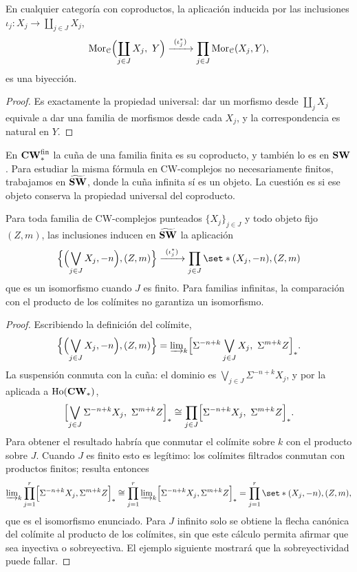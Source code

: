 \begin{lema}\label{lema:prod-morfismos}
En cualquier categoría con coproductos, la aplicación inducida por las inclusiones $\iota_j\colon X_j\to\coprod_{j\in J}X_j$,
\[
\hom_{\mathcal C}\Bigl(\coprod_{j\in J}X_j,\ Y\Bigr)\xrightarrow{\ (\iota_j^*)\ }\prod_{j\in J}\hom_{\mathcal C}(X_j,Y),
\]
es una biyección.
\end{lema}
\begin{proof}
Es exactamente la propiedad universal: dar un morfismo desde $\coprod_jX_j$ equivale a dar una familia de morfismos desde cada $X_j$, y la correspondencia es natural en $Y$.
\end{proof}

En $\CWstar^{\mathrm{fin}}$ la cuña de una familia finita es su coproducto, y también lo es en $\SW$. Para estudiar la misma fórmula en CW-complejos no necesariamente finitos, trabajamos en $\ESW$, donde la cuña infinita sí es un objeto. La cuestión es si ese objeto conserva la propiedad universal del coproducto.

\begin{prop}\label{prop:aditividad-familias}
Para toda familia de CW-complejos punteados $\{X_j\}_{j\in J}$ y todo objeto fijo $(Z,m)$, las inclusiones inducen en $\ESW$ la aplicación
\[
\Bigl\{\Bigl(\bigvee_{j\in J}X_j,-n\Bigr),(Z,m)\Bigr\}\xrightarrow{\ (\iota_j^*)\ }\prod_{j\in J}\set*{(X_j,-n),(Z,m)}
\]
que es un isomorfismo cuando $J$ es finito. Para familias infinitas, la comparación con el producto de los colímites no garantiza un isomorfismo.
\end{prop}
\begin{proof}
Escribiendo la definición del colímite,
\[
\Bigl\{\Bigl(\bigvee_{j\in J}X_j,-n\Bigr),(Z,m)\Bigr\}
=\varinjlim\nolimits_k\Bigl[\Sigma^{-n+k}\bigvee_{j\in J}X_j,\ \Sigma^{m+k}Z\Bigr]_* .
\]
La suspensión conmuta con la cuña: el dominio es $\bigvee_{j\in J}\Sigma^{-n+k}X_j$, y por la  aplicada a $\Ho(\CWstar)$,
\[
\Bigl[\bigvee_{j\in J}\Sigma^{-n+k}X_j,\ \Sigma^{m+k}Z\Bigr]_*
\cong\prod_{j\in J}\Bigl[\Sigma^{-n+k}X_j,\ \Sigma^{m+k}Z\Bigr]_* .
\]
Para obtener el resultado habría que conmutar el colímite sobre $k$ con el producto sobre $J$. Cuando $J$ es finito esto es legítimo: los colímites filtrados conmutan con productos finitos; resulta entonces
\[
\varinjlim\nolimits_k\prod_{j=1}^r\Bigl[\Sigma^{-n+k}X_j,\Sigma^{m+k}Z\Bigr]_*
\cong\prod_{j=1}^r\varinjlim\nolimits_k\Bigl[\Sigma^{-n+k}X_j,\Sigma^{m+k}Z\Bigr]_*
=\prod_{j=1}^r\set*{(X_j,-n),(Z,m)},
\]
que es el isomorfismo enunciado. Para $J$ infinito solo se obtiene la flecha canónica del colímite al producto de los colímites, sin que este cálculo permita afirmar que sea inyectiva o sobreyectiva. El ejemplo siguiente mostrará que la sobreyectividad puede fallar.
\end{proof}

